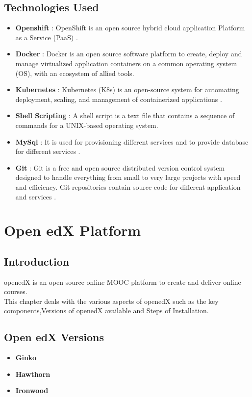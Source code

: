 \documentclass[11pt]{report}
\begin{document}
	\section{Technologies Used}
	\vspace{0.8cm}
	\begin{itemize}
		\item 
		\textbf{Openshift} : OpenShift is an open source hybrid cloud application Platform as a Service (PaaS) .
		\item
		\textbf{Docker} : Docker is an open source software platform to create, deploy and manage virtualized application containers on a common operating system (OS), with an ecosystem of allied tools.
		\item
		\textbf{Kubernetes} : Kubernetes (K8s) is an open-source system for automating deployment, scaling, and management of containerized applications .
		\item
		\textbf{Shell Scripting} : 
		A shell script is a text file that contains a sequence of commands for a UNIX-based operating system.
		\item
		\textbf{MySql} : It is used for provisioning different services and to provide database for different services .
		\item
		\textbf{Git} : Git is a free and open source distributed version control system designed to handle everything from small to very large projects with speed and efficiency. Git repositories contain
		source code for different application and services .
	\end{itemize}
	
	
	\pagebreak
	
	
	\chapter{Open edX Platform}
	\section{Introduction}
	openedX is an open source online MOOC platform to create and deliver online courses.\ \\
	This chapter deals with the various aspects of openedX such as the key components,Versions of openedX available and Steps of Installation.
	\section{Open edX Versions}
	\begin{itemize}
		\large
		\item  \textbf{Ginko}
		\item  \textbf{Hawthorn}
		\item  \textbf{Ironwood}
	\end{itemize}
\end{document}
